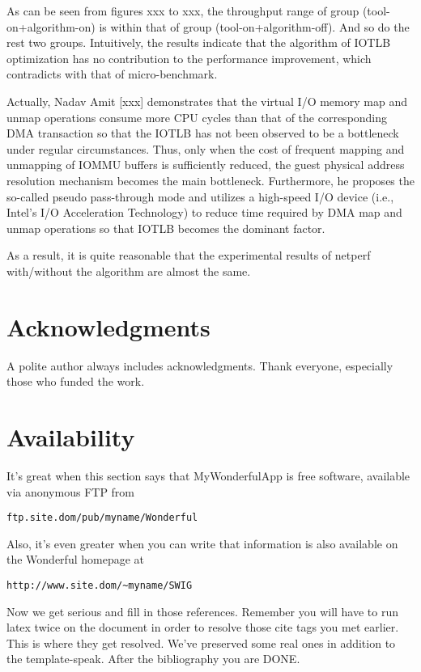 \documentclass[letterpaper,twocolumn,10pt]{article}
\begin{document}
As can be seen from figures xxx to xxx, the throughput range of group (tool-on+algorithm-on) is within that of group (tool-on+algorithm-off). And so do the rest two groups. Intuitively, the results indicate that the algorithm of IOTLB optimization has no contribution to the performance improvement, which contradicts with that of micro-benchmark.

Actually, Nadav Amit [xxx] demonstrates that the virtual I/O memory map and unmap operations consume more CPU cycles than  that of the corresponding DMA transaction so that the IOTLB has not been observed to be a bottleneck under regular circumstances. Thus, only when the cost of frequent mapping and unmapping of IOMMU buffers is sufficiently reduced, the guest physical address resolution mechanism becomes the main bottleneck. Furthermore, he proposes the so-called pseudo pass-through mode and utilizes a high-speed I/O device (i.e., Intel’s I/O Acceleration Technology) to reduce time required by DMA map and unmap operations so that IOTLB becomes the dominant factor.

As a result, it is quite reasonable that the experimental results of netperf with/without the algorithm are almost the same.



\section{Acknowledgments}

A polite author always includes acknowledgments.  Thank everyone,
especially those who funded the work.

\section{Availability}

It's great when this section says that MyWonderfulApp is free software,
available via anonymous FTP from

\begin{center}
{\tt ftp.site.dom/pub/myname/Wonderful}\\
\end{center}

Also, it's even greater when you can write that information is also
available on the Wonderful homepage at

\begin{center}
{\tt http://www.site.dom/\~{}myname/SWIG}
\end{center}

Now we get serious and fill in those references.  Remember you will
have to run latex twice on the document in order to resolve those
cite tags you met earlier.  This is where they get resolved.
We've preserved some real ones in addition to the template-speak.
After the bibliography you are DONE.

{\footnotesize 
}


\theendnotes
\end{document}
